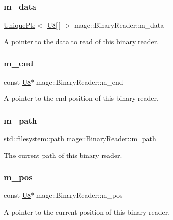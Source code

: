 \subsubsection{\texorpdfstring{m\+\_\+data}{m\_data}}
{\footnotesize\ttfamily \mbox{\hyperlink{namespacemage_a3316d7143a973e37adf1110f2e80ca31}{Unique\+Ptr}}$<$ \mbox{\hyperlink{namespacemage_a30677c03d683c4c35630c25f6ff3fb7f}{U8}}\mbox{[}$\,$\mbox{]} $>$ mage\+::\+Binary\+Reader\+::m\+\_\+data\hspace{0.3cm}{\ttfamily [private]}}

A pointer to the data to read of this binary reader. \mbox{\label{classmage_1_1_binary_reader_a19b0f36cb1e8a05aaa9471514242e8ef}} 
\subsubsection{\texorpdfstring{m\+\_\+end}{m\_end}}
{\footnotesize\ttfamily const \mbox{\hyperlink{namespacemage_a30677c03d683c4c35630c25f6ff3fb7f}{U8}}$\ast$ mage\+::\+Binary\+Reader\+::m\+\_\+end\hspace{0.3cm}{\ttfamily [private]}}

A pointer to the end position of this binary reader. \mbox{\label{classmage_1_1_binary_reader_a0941e624c8386fee2e2e92c6d1efdb75}} 
\subsubsection{\texorpdfstring{m\+\_\+path}{m\_path}}
{\footnotesize\ttfamily std\+::filesystem\+::path mage\+::\+Binary\+Reader\+::m\+\_\+path\hspace{0.3cm}{\ttfamily [private]}}

The current path of this binary reader. \mbox{\label{classmage_1_1_binary_reader_aedb9632de1cf95d5af49499217744ed5}} 
\subsubsection{\texorpdfstring{m\+\_\+pos}{m\_pos}}
{\footnotesize\ttfamily const \mbox{\hyperlink{namespacemage_a30677c03d683c4c35630c25f6ff3fb7f}{U8}}$\ast$ mage\+::\+Binary\+Reader\+::m\+\_\+pos\hspace{0.3cm}{\ttfamily [private]}}

A pointer to the current position of this binary reader. 
